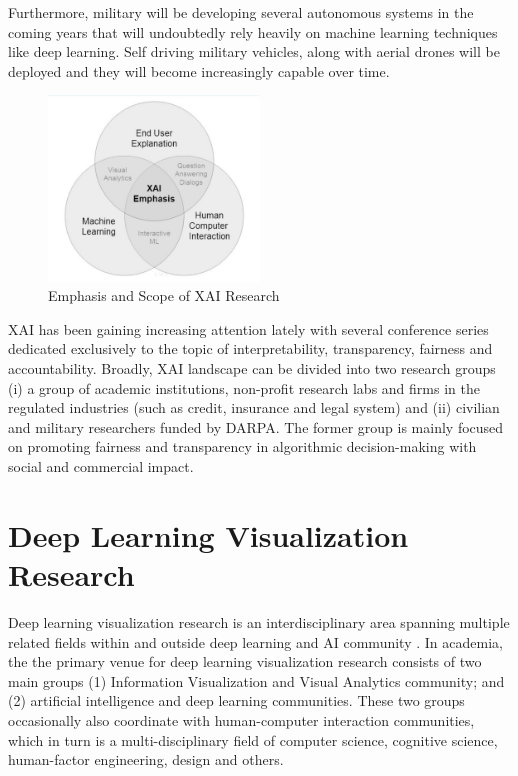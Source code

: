 Furthermore, military will be developing several autonomous systems in the coming years that will undoubtedly rely heavily on machine learning techniques like deep learning. Self driving military vehicles, along with aerial drones will be deployed and they will become increasingly capable over time.

\begin{figure}[htbp]
\centering
\includegraphics[width=0.5\textwidth]{images/XAI-research-1-crop.png}
\caption{Emphasis and Scope of XAI Research}
\label{fig:xai-1}
\end{figure}

XAI has been gaining increasing attention lately with several conference series dedicated exclusively to the topic of interpretability, transparency, fairness and accountability. Broadly, XAI landscape can be divided into two research groups (i) a group of academic institutions, non-profit research labs and firms in the regulated industries (such as credit, insurance and legal system) and (ii) civilian and military researchers funded by DARPA. The former group is mainly focused on promoting fairness and transparency in algorithmic decision-making with social and commercial impact.

\section{Deep Learning Visualization Research}


Deep learning visualization research is an interdisciplinary area spanning multiple related fields within and outside deep learning and AI community \cite{Choo2018}. In academia, the the primary venue for deep learning visualization research consists of two main groups (1) Information Visualization and Visual Analytics community; and (2) artificial intelligence and deep learning communities. These two groups occasionally also coordinate with human-computer interaction communities, which in turn is a multi-disciplinary field of computer science, cognitive science, human-factor engineering, design and others.

